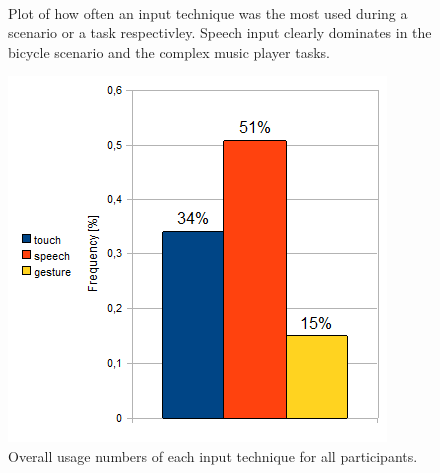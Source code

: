 \begin{figure}[bth]
	\myfloatalign
	 \\
	\caption{Plot of how often an input technique was the most used during a scenario or a task respectivley. Speech input clearly dominates in the bicycle scenario and the complex music player tasks.}
	\label{fig:inputUsage}
\end{figure}

\begin{figure}[bth]
	\myfloatalign
	\label{fig:overallUsage}
	\includegraphics[width=.8\linewidth]{img/overallUsage.png}
	\caption{Overall usage numbers of each input technique for all participants.}
\end{figure}

